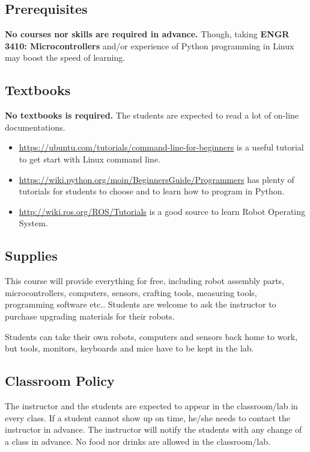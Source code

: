 \documentclass[11pt,letterpaper]{article}
\begin{document}
\subsection*{Prerequisites}
\textbf{No courses nor skills are required in advance.} Though, taking \textbf{ENGR 3410: Microcontrollers} and/or experience of Python programming in Linux may boost the speed of learning. 

\subsection*{Textbooks}
\textbf{No textbooks is required.} The students are expected to read a lot of on-line documentations.
\begin{itemize}
    \item \href{https://ubuntu.com/tutorials/command-line-for-beginners#1-overview}{https://ubuntu.com/tutorials/command-line-for-beginners} is a useful tutorial to get start with Linux command line.
    \item \href{https://wiki.python.org/moin/BeginnersGuide/Programmers}{https://wiki.python.org/moin/BeginnersGuide/Programmers} has plenty of tutorials for students to choose and to learn how to program in Python.
    \item \href{http://wiki.ros.org/ROS/Tutorials}{http://wiki.ros.org/ROS/Tutorials} is a good source to learn Robot Operating System.
\end{itemize}

\subsection*{Supplies}
This course will provide everything for free, including robot assembly parts, microcontrollers, computers, sensors, crafting tools, measuring tools, programming software etc.. Students are welcome to ask the instructor to purchase upgrading materials for their robots.

Students can take their own robots, computers and sensors back home to work, but tools, monitors, keyboards and mice have to be kept in the lab. 

\subsection*{Classroom Policy}
The instructor and the students are expected to appear in the classroom/lab in every class. If a student cannot show up on time, he/she needs to contact the instructor in advance. The instructor will notify the students with any change of a class in advance. No food nor drinks are allowed in the classroom/lab.
\end{document}

